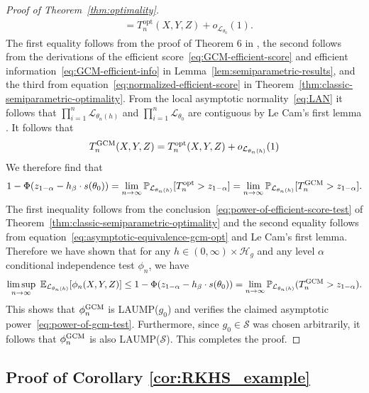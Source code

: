 \documentclass[aos]{imsart}
\theoremstyle{definition}
\theoremstyle{remark}
\newcommand{\E}{\mathbb E}								%
\renewcommand{\P}{\mathbb{P}}							%
\newcommand{\srx}{X}									%
\newcommand{\srz}{Z}									%
\newcommand{\sry}{Y}									%
\newcommand{\law}{\mathcal L}							%
\newcommand{\GCM}{\textnormal{GCM}}						%
\renewcommand{\H}{\mathcal H}		 					%
\begin{document}
\begin{proof}[Proof of Theorem~\ref{thm:optimality}]
\begin{equation}
\begin{split}
&= T_n^{\text{opt}}(\srx, \sry, \srz) + o_{\law_{\theta_0}}(1).
\end{split}
\label{eq:asymptotic-equivalence-gcm-opt}
\end{equation}
The first equality follows from the proof of Theorem 6 in \citet{Shah2018}, the second follows from the derivations of the efficient score~\eqref{eq:GCM-efficient-score} and efficient information~\eqref{eq:GCM-efficient-info} in Lemma~\ref{lem:semiparametric-results}, and the third from equation~\eqref{eq:normalized-efficient-score} in Theorem~\ref{thm:classic-semiparametric-optimality}. From the local asymptotic normality~\eqref{eq:LAN} it follows that $\prod_{i=1}^n\law_{\theta_{n}(h)}$ and $\prod_{i=1}^n\law_{\theta_0}$ are contiguous by Le Cam's first lemma \citep[Example 6.5]{VDV1998}. It follows that 
\begin{equation*}
	T^{\GCM}_n(\srx, \sry, \srz) = T_n^{\text{opt}}(\srx, \sry, \srz) + o_{\law_{\theta_{n}(h)}}(1)
\end{equation*}
We therefore find that
\begin{align*}
	1 - \Phi(z_{1-\alpha} - h_\beta \cdot s(\theta_0)) = \lim_{n\rightarrow\infty}\P_{\law_{\theta_{n}(h)}}[T_n^{\text{opt}}>z_{1-\alpha}]=\lim_{n\rightarrow\infty}\P_{\law_{\theta_{n}(h)}}[T_n^{\GCM}>z_{1-\alpha}].
\end{align*}
The first inequality follows from the conclusion~\eqref{eq:power-of-efficient-score-test} of Theorem~\ref{thm:classic-semiparametric-optimality} and the second equality follows from equation~\eqref{eq:asymptotic-equivalence-gcm-opt} and Le Cam's first lemma. Therefore we have shown that for any $h \in (0, \infty) \times \H_g$ and any level $\alpha$ conditional independence test $\phi_n$, we have
\begin{equation*}
\limsup_{n \rightarrow \infty}\ \E_{\law_{\theta_n(h)}}[\phi_n(\srx, \sry, \srz)] \leq 1 - \Phi(z_{1-\alpha} - h_\beta \cdot s(\theta_0)) = \lim_{n\rightarrow\infty}\P_{\law_{\theta_{n}(h)}}(T_n^{\GCM}>z_{1-\alpha}).
\end{equation*}
This shows that $\phi_n^{\GCM}$ is LAUMP($g_0$) and verifies the claimed asymptotic power~\eqref{eq:power-of-gcm-test}. Furthermore, since $g_0 \in \mathcal S$ was chosen arbitrarily, it follows that $\phi_n^{\GCM}$ is also LAUMP($\mathcal S$). This completes the proof.
\end{proof}

\subsection{Proof of Corollary \ref{cor:RKHS_example}} \label{sec:proof-rkhs}
\end{document}
